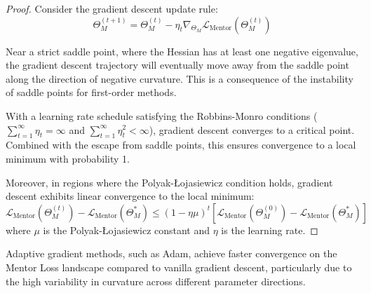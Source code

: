 \begin{proof}
Consider the gradient descent update rule:
\begin{equation}
\Theta_M^{(t+1)} = \Theta_M^{(t)} - \eta_t \nabla_{\Theta_M} \mathcal{L}_{\text{Mentor}}(\Theta_M^{(t)})
\end{equation}

Near a strict saddle point, where the Hessian has at least one negative eigenvalue, the gradient descent trajectory will eventually move away from the saddle point along the direction of negative curvature. This is a consequence of the instability of saddle points for first-order methods.

With a learning rate schedule satisfying the Robbins-Monro conditions ($\sum_{t=1}^{\infty} \eta_t = \infty$ and $\sum_{t=1}^{\infty} \eta_t^2 < \infty$), gradient descent converges to a critical point. Combined with the escape from saddle points, this ensures convergence to a local minimum with probability 1.

Moreover, in regions where the Polyak-Łojasiewicz condition holds, gradient descent exhibits linear convergence to the local minimum:
\begin{equation}
\mathcal{L}_{\text{Mentor}}(\Theta_M^{(t)}) - \mathcal{L}_{\text{Mentor}}(\Theta_M^*) \leq (1-\eta\mu)^t[\mathcal{L}_{\text{Mentor}}(\Theta_M^{(0)}) - \mathcal{L}_{\text{Mentor}}(\Theta_M^*)]
\end{equation}
where $\mu$ is the Polyak-Łojasiewicz constant and $\eta$ is the learning rate.
\end{proof}

\begin{theorem}
Adaptive gradient methods, such as Adam, achieve faster convergence on the Mentor Loss landscape compared to vanilla gradient descent, particularly due to the high variability in curvature across different parameter directions.
\end{theorem}

